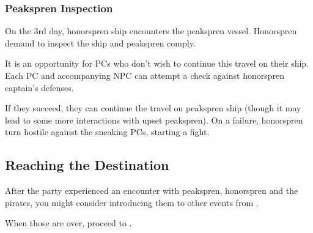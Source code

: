 \subsubsection{Peakspren Inspection}

On the 3rd day, honorspren ship encounters the peakspren vessel. Honorspren demand to inspect the ship and peakspren comply.

It is an opportunity for PCs who don't wish to continue this travel on their ship. Each PC and accompanying NPC can attempt a \skillStealth{} check against honorspren captain's defenses.

If they succeed, they can continue the travel on peakspren ship (though it may lead to some more interactions with upset peakspren). On a failure, honorspren turn hostile against the sneaking PCs, starting a fight.



\subsection{Reaching the Destination}

After the party experienced an encounter with peakspren, honorspren and the pirates, you might consider introducing them to other events from .

When those are over, proceed to .